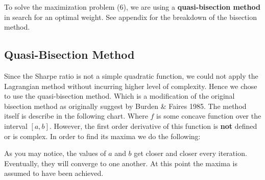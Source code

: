 \documentclass[12pt,titlepage,a4paper]{article}
\begin{document}
		To solve the maximization problem (6), we are using a \textbf{quasi-bisection method} in search for an optimal weight. See appendix for the breakdown of the bisection method.  

	\subsection{Quasi-Bisection Method}
		Since the Sharpe ratio is not a simple quadratic function, we could not apply the Lagrangian method without incurring higher level of complexity. Hence we chose to use the quasi-bisection method. Which is a modification of the original bisection method as originally suggest by Burden \& Faires 1985. The method itself is describe in the following chart. Where $f$ is some concave function over the interval $[a,b]$. However, the first order derivative of this function is \textbf{not} defined or is complex. In order to find its maxima we do the following:
		\begin{center}
		\end{center}
		As you may notice, the values of $a$ and $b$ get closer and closer every iteration. Eventually, they will converge to one another. At this point the maxima is assumed to have been achieved.
\end{document}
